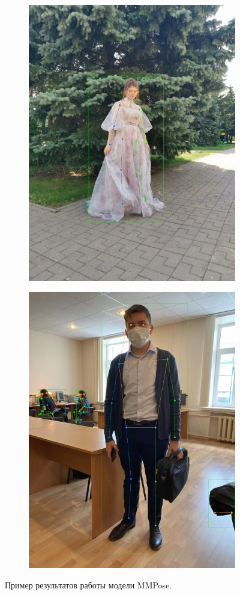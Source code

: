 \begin{figure}[h]
\begin{subfigure}[b]{.5\textwidth}
   \includegraphics[height=\textwidth]{./images/MMPose/36}
   \caption{ }
\end{subfigure}
\begin{subfigure}[b]{.5\textwidth}
	\centering
   \includegraphics[height=\textwidth]{./images/MMPose/33}
   \caption{ }
\end{subfigure}
   \caption{Пример результатов работы модели MMPose.}
   \label{fig:MMP_result}
\end{figure}